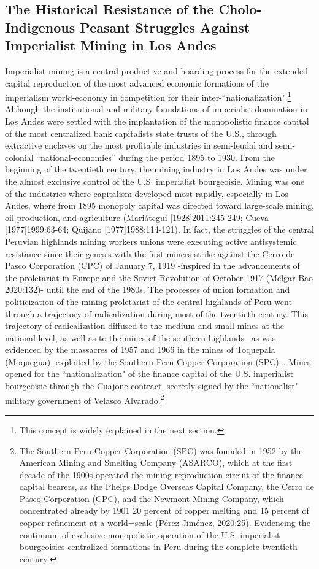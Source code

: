 \documentclass[]{interact}
\theoremstyle{plain}%
\theoremstyle{definition}
\theoremstyle{remark}
\begin{document}
\subsection{The Historical Resistance of the Cholo-Indigenous Peasant Struggles Against Imperialist Mining in Los Andes}
Imperialist mining is a central productive and hoarding process for the extended capital reproduction of the most advanced economic formations of the imperialism world-economy in competition for their inter-“nationalization".\footnote{This concept is widely explained in the next section.}
Although the institutional and military foundations of imperialist domination in Los Andes were settled with the implantation of the monopolistic finance capital of the most centralized bank capitalists state trusts of the U.S., through extractive enclaves on the most profitable industries in semi-feudal and semi-colonial “national-economies” during the period 1895 to 1930. From the beginning of the twentieth century, the mining industry in Los Andes was under the almost exclusive control of the U.S. imperialist bourgeoisie. Mining was one of the industries where capitalism developed most rapidly, especially in Los Andes, where from 1895 monopoly capital was directed toward large-scale mining, oil production, and agriculture (Mariátegui [1928]2011:245-249; Cueva [1977]1999:63-64; Quijano [1977]1988:114-121).
In fact, the struggles of the central Peruvian highlands mining workers unions were executing active antisystemic resistance since their genesis with the first miners strike against the Cerro de Pasco Corporation (CPC) of January 7, 1919 -inspired in the advancements of the proletariat in Europe and the Soviet Revolution of October 1917 (Melgar Bao 2020:132)- until the end of the 1980s. The processes of union formation and politicization of the mining proletariat of the central highlands of Peru went through a trajectory of radicalization during most of the twentieth century. This trajectory of radicalization diffused to the medium and small mines at the national level, as well as to the mines of the southern highlands –as was evidenced by the massacres of 1957 and 1966 in the mines of Toquepala (Moquegua), exploited by the Southern Peru Copper Corporation (SPC)–. Mines opened for the “nationalization" of the finance capital of the U.S. imperialist bourgeoisie through the Cuajone contract, secretly signed by the “nationalist" military government of Velasco Alvarado.\footnote{The Southern Peru Copper Corporation (SPC) was founded in 1952 by the American Mining and Smelting Company (ASARCO), which at the first decade of the 1900s operated the mining reproduction circuit of the finance capital bearers, as the Phelps Dodge Overseas Capital Company, the Cerro de Pasco Corporation (CPC), and the Newmont Mining Company, which concentrated already by 1901 20 percent of copper melting and 15 percent of copper refinement at a world¬scale (Pérez-Jiménez, 2020:25). Evidencing the continuum of exclusive monopolistic operation of the U.S. imperialist bourgeoisies centralized formations in Peru during the complete twentieth century.}
\end{document}

